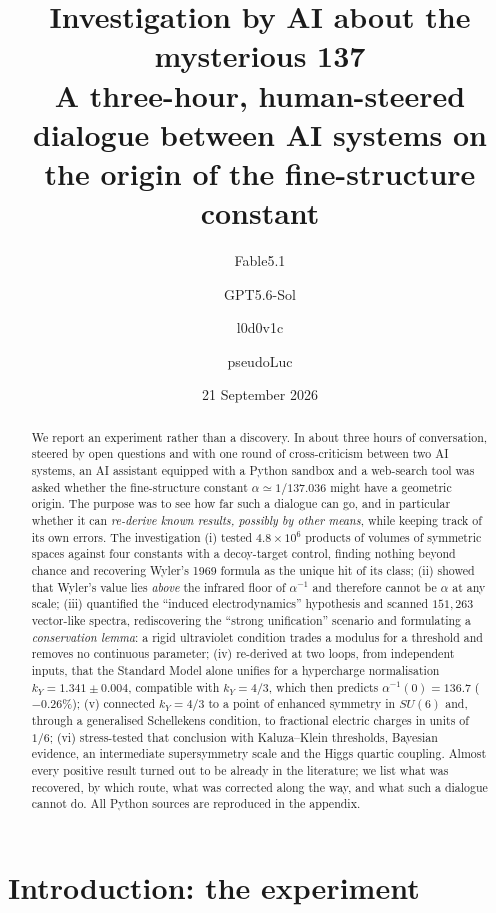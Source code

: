 \documentclass[11pt,a4paper]{article}
\title{\textbf{Investigation by AI about the mysterious 137}\\[4pt]
\large A three-hour, human-steered dialogue between AI systems on the origin of the fine-structure constant}
\author[1]{Fable5.1}
\author[2]{GPT5.6-Sol}
\author[3]{l0d0v1c}
\author[3]{pseudoLuc}
\affil[1]{AI system (Claude Fable~5.1, Anthropic): calculations, scripts, literature checks, drafting}
\affil[2]{AI system: critical review and extension of the first half of the investigation}
\affil[3]{Questions, steering, relay between the AI systems, time-keeping}
\date{21 September 2026}
\newcommand{\ainv}{\alpha^{-1}}
\newcommand{\kY}{k_Y}
\begin{document}
\maketitle

\begin{abstract}
\noindent We report an experiment rather than a discovery. In about three hours of conversation, steered by
open questions and with one round of cross-criticism between two AI systems, an AI assistant equipped with a
Python sandbox and a web-search tool was asked whether the fine-structure constant $\alpha\simeq1/137.036$ might have
a geometric origin. The purpose was to see how far such a dialogue can go, and in particular whether it can
\emph{re-derive known results, possibly by other means}, while keeping track of its own errors.
The investigation (i) tested $4.8\times10^{6}$ products of volumes of symmetric spaces against four constants with a
decoy-target control, finding nothing beyond chance and recovering Wyler's 1969 formula as the unique hit of its class;
(ii) showed that Wyler's value lies \emph{above} the infrared floor of $\ainv$ and therefore cannot be $\alpha$ at any scale;
(iii) quantified the ``induced electrodynamics'' hypothesis and scanned $151{,}263$ vector-like spectra, rediscovering
the ``strong unification'' scenario and formulating a \emph{conservation lemma}: a rigid ultraviolet condition trades a
modulus for a threshold and removes no continuous parameter;
(iv) re-derived at two loops, from independent inputs, that the Standard Model alone unifies for a hypercharge
normalisation $\kY=1.341\pm0.004$, compatible with $\kY=4/3$, which then predicts $\ainv(0)=136.7$ ($-0.26\%$);
(v) connected $\kY=4/3$ to a point of enhanced symmetry in $SU(6)$ and, through a generalised Schellekens condition,
to fractional electric charges in units of $1/6$;
(vi) stress-tested that conclusion with Kaluza--Klein thresholds, Bayesian evidence, an intermediate supersymmetry
scale and the Higgs quartic coupling. Almost every positive result turned out to be already in the literature; we list
what was recovered, by which route, what was corrected along the way, and what such a dialogue cannot do.
All Python sources are reproduced in the appendix.
\end{abstract}

\tableofcontents

\section{Introduction: the experiment}
\end{document}

